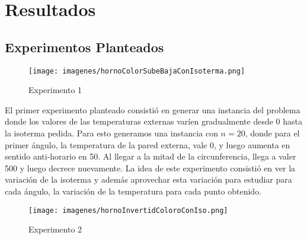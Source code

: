 \section{Resultados}

\subsection{Experimentos Planteados}



\begin{wrapfigure}{r}{0.5\textwidth}
  \vspace{-20pt}
  \begin{center}
    \texttt{[image: imagenes/hornoColorSubeBajaConIsoterma.png]}
  \end{center}
  \vspace{-20pt}
  \caption{Experimento 1}
  \vspace{-10pt}
  \label{fig:Exp1}
\end{wrapfigure}

El primer experimento planteado consistió en generar una instancia del problema donde los valores de las temperaturas externas varíen gradualmente desde 0 hasta la isoterma pedida. Para esto generamos una instancia con $n=20$, donde para el primer ángulo, la temperatura de la pared externa, vale $0$, y luego aumenta en sentido anti-horario en 50. Al llegar a la mitad de la circunferencia, llega a valer 500 y luego decrece nuevamente. La idea de este experimento consistió en ver la variación de la isoterma y además aprovechar esta variación para estudiar para cada ángulo, la variación de la temperatura para cada punto obtenido.
\\
\begin{wrapfigure}{r}{0.5\textwidth}
  \vspace{-20pt}
  \begin{center}
    \texttt{[image: imagenes/hornoInvertidColoroConIso.png]}
  \end{center}
  \vspace{-20pt}
  \caption{Experimento 2}
  \vspace{-10pt}
  \label{fig:Exp1}
\end{wrapfigure}


